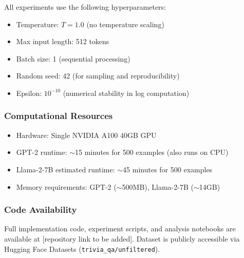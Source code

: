 All experiments use the following hyperparameters:
\begin{itemize}
\item Temperature: $T=1.0$ (no temperature scaling)
\item Max input length: 512 tokens
\item Batch size: 1 (sequential processing)
\item Random seed: 42 (for sampling and reproducibility)
\item Epsilon: $10^{-10}$ (numerical stability in log computation)
\end{itemize}

\subsubsection{Computational Resources}

\begin{itemize}
\item Hardware: Single NVIDIA A100 40GB GPU
\item GPT-2 runtime: $\sim$15 minutes for 500 examples (also runs on CPU)
\item Llama-2-7B estimated runtime: $\sim$45 minutes for 500 examples
\item Memory requirements: GPT-2 ($\sim$500MB), Llama-2-7B ($\sim$14GB)
\end{itemize}

\subsubsection{Code Availability}

Full implementation code, experiment scripts, and analysis notebooks are available at [repository link to be added]. Dataset is publicly accessible via Hugging Face Datasets (\texttt{trivia\_qa/unfiltered}).

